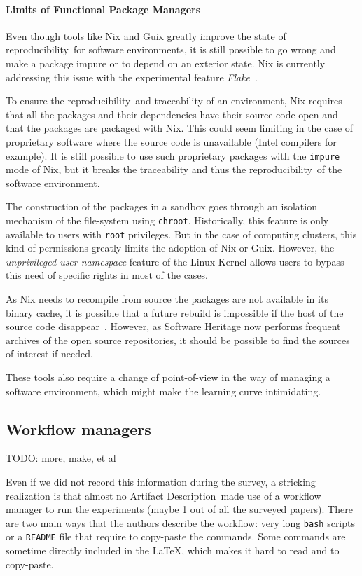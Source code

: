 \documentclass[sigconf]{acmart}
\newcommand{\repro}{reproducibility}
\newcommand{\ad}{Artifact Description}
\newcommand{\todo}[1]{{\color{red}TODO: #1}}
\begin{document}
\paragraph{Limits of Functional Package Managers}

Even though tools like Nix and Guix greatly improve the state of \repro\ for software environments, it is still possible to go wrong and make a package impure or to depend on an exterior state.
Nix is currently addressing this issue with the experimental feature \emph{Flake}\ \cite{flakes}.

To ensure the \repro\ and traceability of an environment, Nix requires that all the packages and their dependencies have their source code open and that the packages are packaged with Nix.
This could seem limiting in the case of proprietary software where the source code is unavailable (Intel compilers for example).
It is still possible to use such proprietary packages with the \texttt{impure} mode of Nix, but it breaks the traceability and thus the \repro\ of the software environment. 


The construction of the packages in a sandbox goes through an isolation mechanism of the file-system using \texttt{chroot}.
Historically, this feature is only available to users with \texttt{root} privileges.
But in the case of computing clusters, this kind of permissions greatly limits the adoption of Nix or Guix.
However, the \emph{unprivileged user namespace} feature of the Linux Kernel allows users to bypass this need of specific rights in most of the cases.

As Nix needs to recompile from source the packages are not available in its binary cache, it is possible that a future rebuild is impossible if the host of the source code disappear\ \cite{blinry}.
However, as Software Heritage now performs frequent archives of the open source repositories, it should be possible to find the sources of interest if needed.

These tools also require a change of point-of-view in the way of managing a software environment, which might make the learning curve intimidating.


\subsection{Workflow managers}\label{sec:sop:workflow}

\todo{more, make, et al}

Even if we did not record this information during the survey, a stricking realization is that almost no \ad\ made use of a workflow manager to run the experiments (maybe 1 out of all the  surveyed papers).
There are two main ways that the authors describe the workflow: very long \texttt{bash} scripts or a \texttt{README} file that require to copy-paste the commands.
Some commands are sometime directly included in the LaTeX, which makes it hard to read and to copy-paste.
\end{document}
